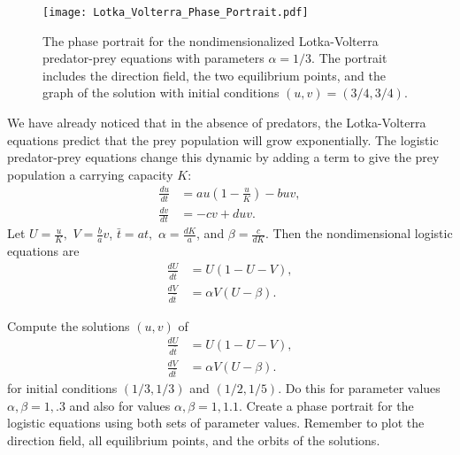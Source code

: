 \begin{figure}[ht]
\centering
\texttt{[image: Lotka\_Volterra\_Phase\_Portrait.pdf]}
\caption{The phase portrait for the nondimensionalized Lotka-Volterra predator-prey equations with parameters $\alpha = 1/3$. 
The portrait includes the direction field, the two equilibrium points, and the graph of the solution with initial conditions $(u,v) = (3/4, 3/4)$. }
\label{fig:pred-prey_Lotka_Voterra_Phase_Portrait}
\end{figure}

We have already noticed that in the absence of predators, the Lotka-Volterra equations predict that the prey population will grow exponentially.
The logistic predator-prey equations change this dynamic by adding a term to give the prey population a carrying capacity $K$: 
\begin{align*}
	\frac{du}{dt} &= au\left(1 -\frac{u}{K}\right) - buv,\\
	\frac{dv}{dt} &= -cv + duv.
\end{align*}
Let $U = \frac{u}{K},$ $V = \frac{b}{a}v$, $\bar{t} = at,$  $\alpha = \frac{dK}{a}$, and $\beta = \frac{c}{dK}$.
Then the nondimensional logistic equations are 
\begin{align*}
	\frac{dU}{d\bar{t}} &= U(1-U-V),\\
	\frac{dV}{d\bar{t}} &= \alpha V (U-\beta).
\end{align*}

\begin{problem}
Compute the solutions $(u,v)$ of 
\begin{align*}
	\frac{dU}{d\bar{t}} &= U(1-U-V),\\
	\frac{dV}{d\bar{t}} &= \alpha V (U-\beta).
\end{align*}
for initial conditions $(1/3, 1/3)$ and $(1/2, 1/5)$.
Do this for parameter values $\alpha, \beta = 1, .3$ and also for values $\alpha, \beta = 1, 1.1$.
Create a phase portrait for the logistic equations using both sets of parameter values.
Remember to plot the direction field, all equilibrium points, and the orbits of the solutions.
\end{problem}